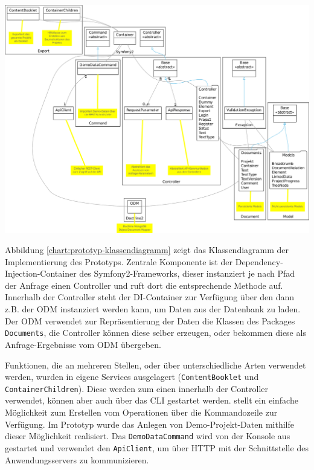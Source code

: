 \begin{center}
\includegraphics[width=\textwidth]{media/prototyp-klassendiagramm.pdf}
\label{chart:prototyp-klassendiagramm}
\end{center}

Abbildung \ref{chart:prototyp-klassendiagramm} zeigt das Klassendiagramm der Implementierung des Prototyps. Zentrale Komponente ist der Dependency-Injection-Container des Symfony2-Frameworks, dieser instanziert je nach Pfad der Anfrage einen Controller und ruft dort die entsprechende Methode auf. Innerhalb der Controller steht der DI-Container zur Verfügung über den dann z.B. der ODM instanziert werden kann, um Daten aus der Datenbank zu laden. Der ODM verwendet zur Repräsentierung der Daten die Klassen des Packages \texttt{Documents}, die Controller können diese selber erzeugen, oder bekommen diese als Anfrage-Ergebnisse vom ODM übergeben.

Funktionen, die an mehreren Stellen, oder über unterschiedliche Arten verwendet werden, wurden in eigene Services ausgelagert (\texttt{ContentBooklet} und \texttt{ContainerChildren}). Diese werden zum einen innerhalb der Controller verwendet, können aber auch über das CLI gestartet werden.  stellt ein einfache Möglichkeit zum Erstellen vom Operationen über die Kommandozeile zur Verfügung. Im Prototyp wurde das Anlegen von Demo-Projekt-Daten mithilfe dieser Möglichkeit realisiert. Das \texttt{DemoDataCommand} wird von der Konsole aus gestartet und verwendet den \texttt{ApiClient}, um über HTTP mit der Schnittstelle des Anwendungsservers zu kommunizieren.

